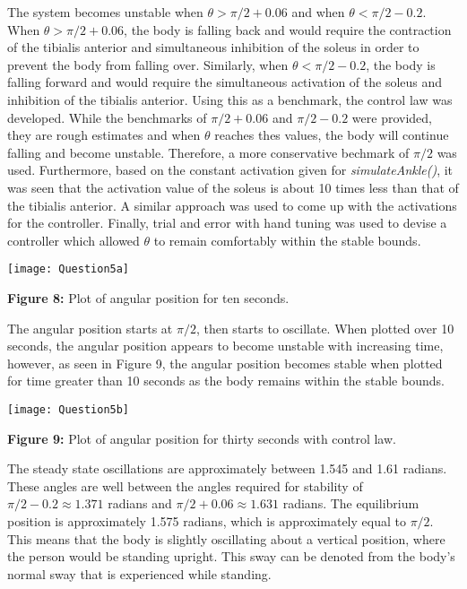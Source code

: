 \documentclass{article}
\begin{document}
The system becomes unstable when $\theta > \pi/2 + 0.06$ and when $\theta < \pi/2 - 0.2$. When $\theta > \pi/2 + 0.06$, the body is falling back and would require the contraction of the tibialis anterior and simultaneous inhibition of the soleus in order to prevent the body from falling over. Similarly, when $\theta < \pi/2 - 0.2$, the body is falling forward and would require the simultaneous activation of the soleus and inhibition of the tibialis anterior. Using this as a benchmark, the control law was developed. While the benchmarks of $\pi/2 + 0.06$ and $\pi/2 - 0.2$ were provided, they are rough estimates and when $\theta$ reaches thes values, the body will continue falling and become unstable. Therefore, a more conservative bechmark of $\pi/2$ was used. Furthermore, based on the constant activation given for \textit{simulateAnkle()}, it was seen that the activation value of the soleus is about 10 times less than that of the tibialis anterior. A similar approach was used to come up with the activations for the controller. Finally, trial and error with hand tuning was used to devise a controller which allowed $\theta$ to remain comfortably within the stable bounds.

\noindent
\texttt{[image: Question5a]}
\begin{center}\textbf{Figure 8:} Plot of angular position for ten seconds.\end{center}

The angular position starts at $\pi/2$, then starts to oscillate. When plotted over 10 seconds, the angular position appears to become unstable with increasing time, however, as seen in Figure 9, the angular position becomes stable when plotted for time greater than 10 seconds as the body remains within the stable bounds.

\noindent
\texttt{[image: Question5b]}
\begin{center}\textbf{Figure 9:} Plot of angular position for thirty seconds with control law.\end{center}

The steady state oscillations are approximately between 1.545 and 1.61 radians. These angles are well between the angles required for stability of $\pi/2 - 0.2 \approx 1.371$ radians and $\pi/2 + 0.06  \approx 1.631$ radians. The equilibrium position is approximately 1.575 radians, which is approximately equal to $\pi/2$. This means that the body is slightly oscillating about a vertical position, where the person would be standing upright. This sway can be denoted from the body's normal sway that is experienced while standing.
\end{document}
